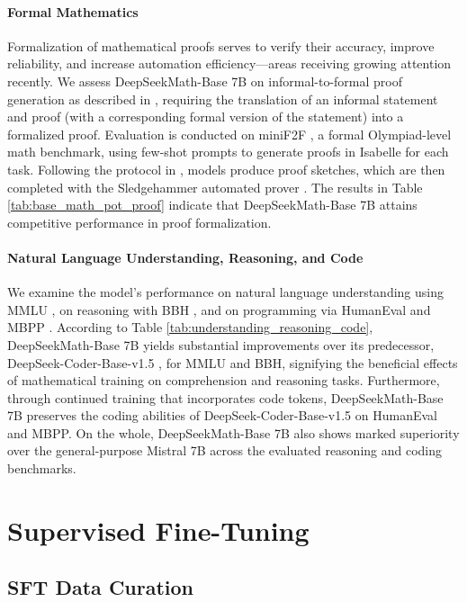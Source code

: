\paragraph{Formal Mathematics}

Formalization of mathematical proofs serves to verify their accuracy, improve reliability, and increase automation efficiency—areas receiving growing attention recently. We assess DeepSeekMath-Base 7B on informal-to-formal proof generation as described in \citep{dsp_proof}, requiring the translation of an informal statement and proof (with a corresponding formal version of the statement) into a formalized proof. Evaluation is conducted on miniF2F \citep{minif2f}, a formal Olympiad-level math benchmark, using few-shot prompts to generate proofs in Isabelle for each task. Following the protocol in \cite{dsp_proof}, models produce proof sketches, which are then completed with the Sledgehammer automated prover \citep{sledgehammer}. The results in Table \ref{tab:base_math_pot_proof} indicate that DeepSeekMath-Base 7B attains competitive performance in proof formalization.

\paragraph{Natural Language Understanding, Reasoning, and Code}

We examine the model’s performance on natural language understanding using MMLU \citep{mmlu}, on reasoning with BBH \citep{bbh}, and on programming via HumanEval \citep{codex} and MBPP \citep{mbpp}. According to Table \ref{tab:understanding_reasoning_code}, DeepSeekMath-Base 7B yields substantial improvements over its predecessor, DeepSeek-Coder-Base-v1.5 \citep{deepseek-coder}, for MMLU and BBH, signifying the beneficial effects of mathematical training on comprehension and reasoning tasks. Furthermore, through continued training that incorporates code tokens, DeepSeekMath-Base 7B preserves the coding abilities of DeepSeek-Coder-Base-v1.5 on HumanEval and MBPP. On the whole, DeepSeekMath-Base 7B also shows marked superiority over the general-purpose Mistral 7B \citep{mistral} across the evaluated reasoning and coding benchmarks.

\section{Supervised Fine-Tuning}

\subsection{SFT Data Curation}

